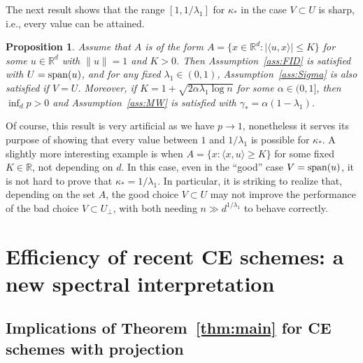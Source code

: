 \documentclass[]{article}
\newcommand{\R}{\mathbb{R}}
\theoremstyle{plain}
\newtheorem{prop}[lemma]{Proposition}
\theoremstyle{definition}
\begin{document}
The next result shows that the range $[1,1/\lambda_1]$ for $\kappa_*$ in the case $V \subset U$ is sharp, i.e., every value can be attained.


\begin{prop} \label{prop:range}
	Assume that $A$ is of the form $A = \{x \in \R^d: \lvert \langle u, x \rangle \rvert \leq K \}$ for some $u \in \R^d$ with $\lVert u \rVert = 1$ and $K > 0$. Then Assumption~\ref{ass:FID} is satisfied with $U = {\rm span}(u)$, and for any fixed $\lambda_1 \in (0,1)$, Assumption~\ref{ass:Sigma} is also satisfied if $V = U$. Moreover, if $K = 1 + \sqrt{2 \alpha \lambda_1 \log n}$ for some $\alpha \in (0,1]$, then $\inf_d p > 0$ and Assumption~\ref{ass:MW} is satisfied with $\gamma_* = \alpha (1-\lambda_1)$.
\end{prop}

Of course, this result is very artificial as we have $p \to 1$, nonetheless it serves its purpose of showing that every value between $1$ and $1/\lambda_1$ is possible for $\kappa_*$. A slightly more interesting example is when $A = \{x: \langle x, u \rangle \geq K\}$ for some fixed $K \in \R$, not depending on $d$. In this case, even in the ``good'' case $V = {\rm span}(u)$, it is not hard to prove that $\kappa_* = 1/\lambda_1$. In particular, it is striking to realize that, depending on the set $A$, the good choice $V \subset U$ may not improve the performance of the bad choice $V \subset U_\perp$, with both needing $n \gg d^{1/\lambda_1}$ to behave correctly.




\section{Efficiency of recent CE schemes: a new spectral interpretation} \label{sec:main-newlook}

\subsection{Implications of Theorem~\ref{thm:main} for CE schemes with projection} \label{sub:implications}
\end{document}
